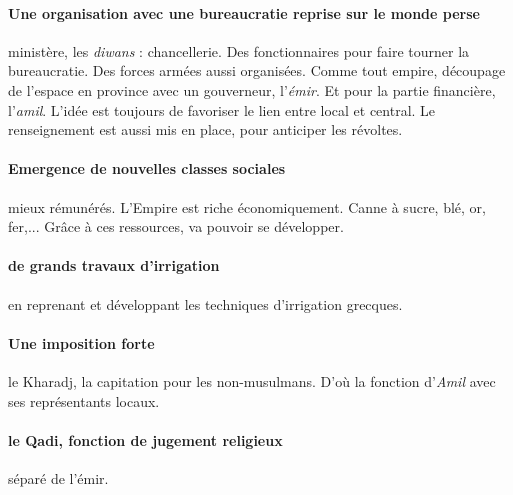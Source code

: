 \paragraph{Une organisation avec une bureaucratie reprise sur le monde perse} ministère, les \textit{diwans} : chancellerie. Des fonctionnaires pour faire tourner la bureaucratie. Des forces armées aussi organisées.  Comme tout empire, découpage de l'espace en province avec un gouverneur, l'\textit{émir}. Et pour la partie financière, l'\textit{amil}. L'idée est toujours de favoriser le lien entre local et central. Le renseignement est aussi mis en place, pour anticiper les révoltes. 

\paragraph{Emergence de nouvelles classes sociales} mieux rémunérés. L'Empire est riche économiquement. Canne à sucre, blé, or, fer,... Grâce à ces ressources, va pouvoir se développer.

\paragraph{de grands travaux d'irrigation} en reprenant et développant les techniques d'irrigation grecques. 

\paragraph{Une imposition forte} le Kharadj, la capitation pour les non-musulmans. D'où la fonction d'\textit{Amil} avec ses représentants locaux.

\paragraph{le Qadi, fonction de jugement religieux} séparé de l'émir.



